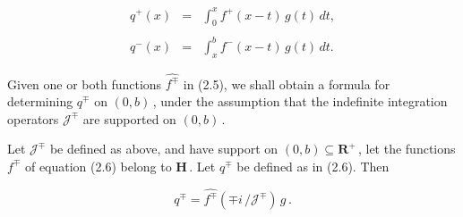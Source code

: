 \documentclass[10pt,a4paper]{amsart}
\begin{document}
 \begin{equation}%
 \begin{array}{rcl}
   q^+(x) & = & \displaystyle  \int_0^x f^+(x-t)\,g(t)\,dt, \\
   && \\
   q^-(x) & = & \displaystyle  \int_x^b f^-(x-t)\,g(t)\,dt.
 \end{array}
 \label{equation:2.9}
 \end{equation}

\noindent Given one or both functions $\widehat{f^\mp}$ in (2.5), we shall 
obtain a formula for determining $q^\mp$ on $(0,b)$\,, under the
assumption that the indefinite integration operators ${\mathcal
  J}^\mp$ are supported on $(0,b)$\,. 

  \begin{Theorem}%
    \label{theorem:2.5}
Let ${\mathcal J}^\mp$ be defined as above, and have support on $(0,b)
\subseteq {\mathbf R}^+$\,, let the functions $f^\mp$ of equation
(2.6) belong to ${\mathbf H}$\,.  Let $q^\mp$ be defined as in
(2.6).  Then
 
 \begin{equation}%
 q^\mp = \widehat{f^\mp}\left(\mp i\,/{\mathcal J}^\mp\right)\,g\,.
\label{equation:2.10}
 \end{equation}

 \end{Theorem}
\end{document}
